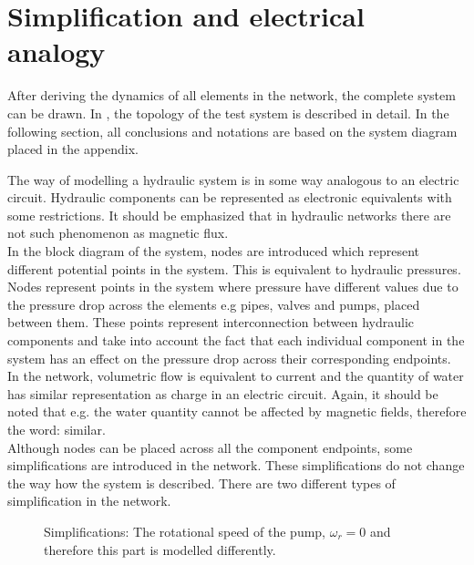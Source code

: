 \section{Simplification and electrical analogy}  
\label{SystemModel}

After deriving the dynamics of all elements in the network, the complete system can be drawn. In , the topology of the test system is described in detail. In the following section, all conclusions and notations are based on the system diagram placed in the appendix. 

The way of modelling a hydraulic system is in some way analogous to an electric circuit. Hydraulic components can be represented as electronic equivalents with some restrictions. It should be emphasized that in hydraulic networks there are not such phenomenon as magnetic flux. 
\\
In the block diagram of the system, nodes are introduced which represent different potential points in the system. This is equivalent to hydraulic pressures. Nodes represent points in the system where pressure have different values due to the pressure drop across the elements e.g pipes, valves and pumps, placed between them. These points represent interconnection between hydraulic components and take into account the fact that each individual component in the system has an effect on the pressure drop across their corresponding endpoints.
\\
In the network, volumetric flow is equivalent to current and the quantity of water has similar representation as charge in an electric circuit. Again, it should be noted that e.g. the water quantity cannot be affected by magnetic fields, therefore the word: similar.
\\ 
Although nodes can be placed across all the component endpoints, some simplifications are introduced in the network. These simplifications do not change the way how the system is described. There are two different types of simplification in the network. %


\begin{figure}[H]
	\centering
	 
	\caption{Simplifications: The rotational speed of the pump, $\omega_r = 0$ and therefore this part is modelled differently.}
	  \label{fig:subsys_1}
\end{figure}

